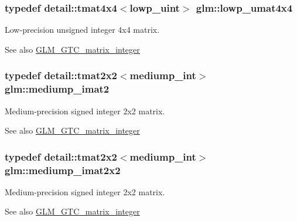 \subsubsection[{lowp\+\_\+umat4x4}]{\setlength{\rightskip}{0pt plus 5cm}typedef detail\+::tmat4x4$<$lowp\+\_\+uint$>$ {\bf glm\+::lowp\+\_\+umat4x4}}\label{group__gtc__matrix__integer_ga38b31bccefd74f6a9e9272cac084df34}
Low-\/precision unsigned integer 4x4 matrix. \begin{DoxySeeAlso}{See also}
\hyperlink{group__gtc__matrix__integer}{G\+L\+M\+\_\+\+G\+T\+C\+\_\+matrix\+\_\+integer} 
\end{DoxySeeAlso}
\hypertarget{group__gtc__matrix__integer_ga44c16e631d0b5ab68098131183c7e096}{}
\subsubsection[{mediump\+\_\+imat2}]{\setlength{\rightskip}{0pt plus 5cm}typedef detail\+::tmat2x2$<$mediump\+\_\+int$>$ {\bf glm\+::mediump\+\_\+imat2}}\label{group__gtc__matrix__integer_ga44c16e631d0b5ab68098131183c7e096}
Medium-\/precision signed integer 2x2 matrix. \begin{DoxySeeAlso}{See also}
\hyperlink{group__gtc__matrix__integer}{G\+L\+M\+\_\+\+G\+T\+C\+\_\+matrix\+\_\+integer} 
\end{DoxySeeAlso}
\hypertarget{group__gtc__matrix__integer_gaf330f41983ed0d499d18277a44a54720}{}
\subsubsection[{mediump\+\_\+imat2x2}]{\setlength{\rightskip}{0pt plus 5cm}typedef detail\+::tmat2x2$<$mediump\+\_\+int$>$ {\bf glm\+::mediump\+\_\+imat2x2}}\label{group__gtc__matrix__integer_gaf330f41983ed0d499d18277a44a54720}
Medium-\/precision signed integer 2x2 matrix. \begin{DoxySeeAlso}{See also}
\hyperlink{group__gtc__matrix__integer}{G\+L\+M\+\_\+\+G\+T\+C\+\_\+matrix\+\_\+integer} 
\end{DoxySeeAlso}
\hypertarget{group__gtc__matrix__integer_gaafb4b3293de5875ece1181709eddaa13}{}
